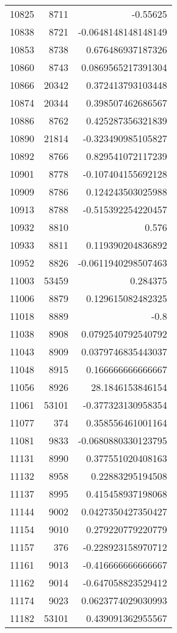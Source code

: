 \begin{tabular}{r | r | r}
10825 & 8711 & -0.55625 \\
10838 & 8721 & -0.0648148148148149 \\
10853 & 8738 & 0.676486937187326 \\
10860 & 8743 & 0.0869565217391304 \\
10866 & 20342 & 0.372413793103448 \\
10874 & 20344 & 0.398507462686567 \\
10886 & 8762 & 0.425287356321839 \\
10890 & 21814 & -0.323490985105827 \\
10892 & 8766 & 0.829541072117239 \\
10901 & 8778 & -0.107404155692128 \\
10909 & 8786 & 0.124243503025988 \\
10913 & 8788 & -0.515392254220457 \\
10932 & 8810 & 0.576 \\
10933 & 8811 & 0.119390204836892 \\
10952 & 8826 & -0.0611940298507463 \\
11003 & 53459 & 0.284375 \\
11006 & 8879 & 0.129615082482325 \\
11018 & 8889 & -0.8 \\
11038 & 8908 & 0.0792540792540792 \\
11043 & 8909 & 0.0379746835443037 \\
11048 & 8915 & 0.166666666666667 \\
11056 & 8926 & 28.1846153846154 \\
11061 & 53101 & -0.377323130958354 \\
11077 & 374 & 0.358556461001164 \\
11081 & 9833 & -0.0680880330123795 \\
11131 & 8990 & 0.377551020408163 \\
11132 & 8958 & 0.22883295194508 \\
11137 & 8995 & 0.415458937198068 \\
11144 & 9002 & 0.0427350427350427 \\
11154 & 9010 & 0.279220779220779 \\
11157 & 376 & -0.228923158970712 \\
11161 & 9013 & -0.416666666666667 \\
11162 & 9014 & -0.647058823529412 \\
11174 & 9023 & 0.0623774029030993 \\
11182 & 53101 & 0.439091362955567 \\

\end{tabular}
